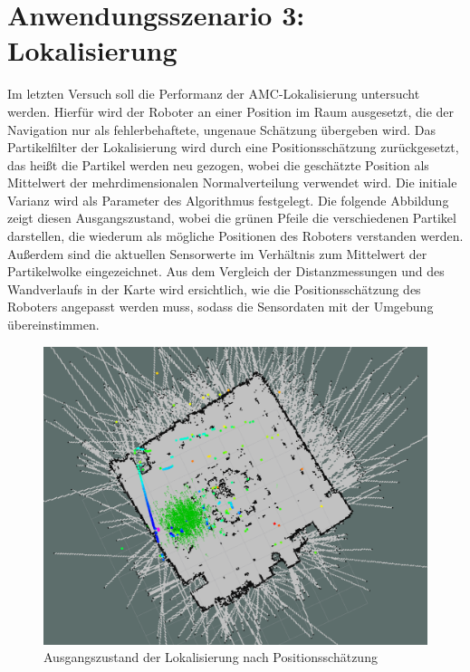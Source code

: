 \section{Anwendungsszenario 3: Lokalisierung}
Im letzten Versuch soll die Performanz der AMC-Lokalisierung untersucht werden. Hierfür wird der Roboter an einer Position im Raum ausgesetzt, die der Navigation nur als fehlerbehaftete, ungenaue Schätzung übergeben wird. Das Partikelfilter der Lokalisierung wird durch eine Positionsschätzung zurückgesetzt, das heißt die Partikel werden neu gezogen, wobei die geschätzte Position als Mittelwert der mehrdimensionalen Normalverteilung verwendet wird. Die initiale Varianz wird als Parameter des Algorithmus festgelegt. Die folgende Abbildung zeigt diesen Ausgangszustand, wobei die grünen Pfeile die verschiedenen Partikel darstellen, die wiederum als mögliche Positionen des Roboters verstanden werden. Außerdem sind die aktuellen Sensorwerte im Verhältnis zum Mittelwert der Partikelwolke eingezeichnet. Aus dem Vergleich der Distanzmessungen und des Wandverlaufs in der Karte wird ersichtlich, wie die Positionsschätzung des Roboters angepasst werden muss, sodass die Sensordaten mit der Umgebung übereinstimmen.
\begin{figure}[!ht]
\centering
\includegraphics[width=0.7\linewidth, trim={4cm 5cm 12cm 6cm},clip]{img/Experiment3_Lokalisierung_1.png}
\caption{Ausgangszustand der Lokalisierung nach Positionsschätzung}
\end{figure}

